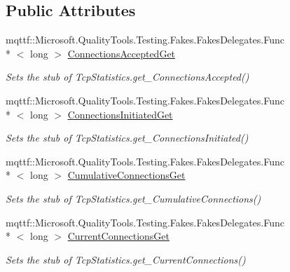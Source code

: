 \subsection*{Public Attributes}
\begin{DoxyCompactItemize}
\item 
mqttf\-::\-Microsoft.\-Quality\-Tools.\-Testing.\-Fakes.\-Fakes\-Delegates.\-Func\\*
$<$ long $>$ \hyperlink{class_system_1_1_net_1_1_network_information_1_1_fakes_1_1_stub_tcp_statistics_a81819c4813559169b633782ce5c95bed}{Connections\-Accepted\-Get}
\begin{DoxyCompactList}\small\item\em Sets the stub of Tcp\-Statistics.\-get\-\_\-\-Connections\-Accepted()\end{DoxyCompactList}\item 
mqttf\-::\-Microsoft.\-Quality\-Tools.\-Testing.\-Fakes.\-Fakes\-Delegates.\-Func\\*
$<$ long $>$ \hyperlink{class_system_1_1_net_1_1_network_information_1_1_fakes_1_1_stub_tcp_statistics_acca95bf724d16f02fbad51c0e6cd882b}{Connections\-Initiated\-Get}
\begin{DoxyCompactList}\small\item\em Sets the stub of Tcp\-Statistics.\-get\-\_\-\-Connections\-Initiated()\end{DoxyCompactList}\item 
mqttf\-::\-Microsoft.\-Quality\-Tools.\-Testing.\-Fakes.\-Fakes\-Delegates.\-Func\\*
$<$ long $>$ \hyperlink{class_system_1_1_net_1_1_network_information_1_1_fakes_1_1_stub_tcp_statistics_af19585632f3548f77331a35713c92e38}{Cumulative\-Connections\-Get}
\begin{DoxyCompactList}\small\item\em Sets the stub of Tcp\-Statistics.\-get\-\_\-\-Cumulative\-Connections()\end{DoxyCompactList}\item 
mqttf\-::\-Microsoft.\-Quality\-Tools.\-Testing.\-Fakes.\-Fakes\-Delegates.\-Func\\*
$<$ long $>$ \hyperlink{class_system_1_1_net_1_1_network_information_1_1_fakes_1_1_stub_tcp_statistics_a5e6b9a872f33abf16668419acc0e2c78}{Current\-Connections\-Get}
\begin{DoxyCompactList}\small\item\em Sets the stub of Tcp\-Statistics.\-get\-\_\-\-Current\-Connections()\end{DoxyCompactList}\item 

\end{DoxyCompactItemize}
